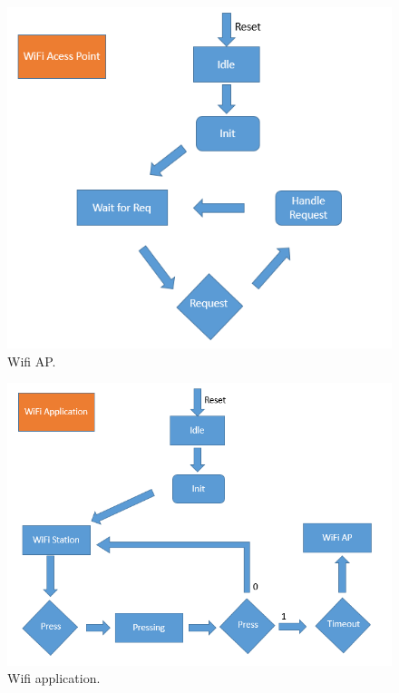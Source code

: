 \documentclass[a4paper,12pt,oneside]{article}
\begin{document}
			\begin{figure}[H]
				\centering
				\includegraphics[scale=.6]{hinh/wifi_ap.PNG}			
				\caption{Wifi AP.}
			\end{figure}
			
			\begin{figure}[H]
				\centering
				\includegraphics[scale=.6]{hinh/wifi_application.PNG}
				\caption{Wifi application.}
			\end{figure}
\end{document}
